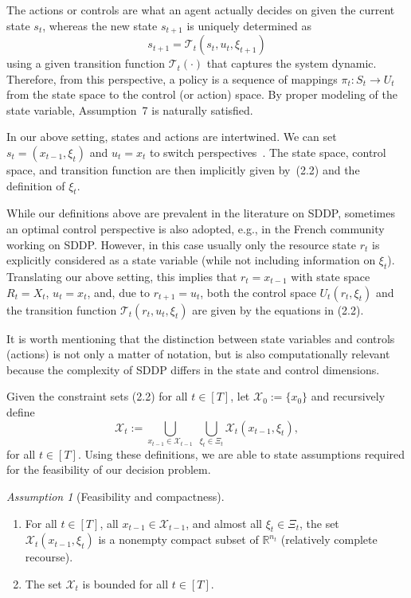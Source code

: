 \documentclass{article}
\theoremstyle{remark}
\newtheorem{assumption}{Assumption}
\begin{document}
The actions or controls are what an agent actually decides on given the current state 
$s_t$, whereas the new state $s_{t+1}$ is uniquely determined as
\[
s_{t+1} = \mathcal{T}_t(s_t,u_t,\xi_{t+1})
\]
using a given transition function $\mathcal{T}_t(\cdot)$ that captures the system 
dynamic. Therefore, from this perspective, a policy is a sequence of mappings 
$\pi_t : S_t \to U_t$ from the state space to the control (or action) space. By proper 
modeling of the state variable, Assumption~7 is naturally satisfied.

In our above setting, states and actions are intertwined. We can set 
$s_t = (x_{t-1},\xi_t)$ and $u_t = x_t$ to switch perspectives~\cite{6}. The state space, 
control space, and transition function are then implicitly given by~(2.2) and the 
definition of $\xi_t$.

While our definitions above are prevalent in the literature on SDDP, sometimes an optimal control perspective is also adopted, e.g., in the French community working on SDDP. However, in this case usually only the resource state $r_t$ is explicitly considered as a state variable (while not including information on $\xi_t$). Translating our above setting, this implies that $r_t = x_{t-1}$ with state space $R_t = X_t$, $u_t = x_t$, and, due to $r_{t+1} = u_t$, both the control space $U_t(r_t,\xi_t)$ and the transition function $\mathcal{T}_t(r_t,u_t,\xi_t)$ are given by the equations in (2.2).

It is worth mentioning that the distinction between state variables and controls 
(actions) is not only a matter of notation, but is also computationally relevant 
because the complexity of SDDP differs in the state and control dimensions.

Given the constraint sets (2.2) for all $t \in [T]$, let $\mathcal{X}_0 := \{x_0\}$ and 
recursively define
\[
\mathcal{X}_t :=
\bigcup_{x_{t-1} \in \mathcal{X}_{t-1}}
\;\bigcup_{\xi_t \in \Xi_t}
\mathcal{X}_t(x_{t-1},\xi_t),
\]
for all $t \in [T]$. Using these definitions, we are able to state 
assumptions required for the feasibility of our decision problem.

\begin{assumption}[Feasibility and compactness]
\leavevmode
\begin{enumerate}
\item For all $t \in [T]$, all $x_{t-1} \in \mathcal{X}_{t-1}$, and almost all $\xi_t \in \Xi_t$, the set $\mathcal{X}_t(x_{t-1},\xi_t)$ is a nonempty compact subset of $\mathbb{R}^{n_t}$ (relatively complete recourse).
\item The set $\mathcal{X}_t$ is bounded for all $t \in [T]$.
\end{enumerate}
\end{assumption}
\end{document}
